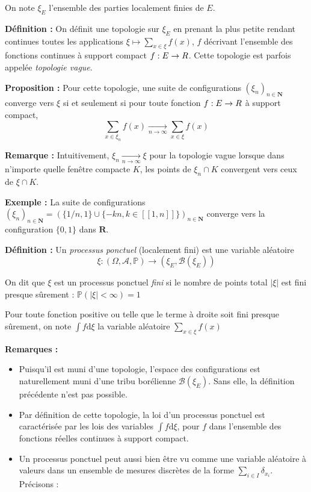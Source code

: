 \documentclass[12pt]{article}
\let\oldsum\sum
\renewcommand{\sum}{\oldsum\limits}
\begin{document}
On note $ \xi_E $ l'ensemble des parties localement finies de $E$. 

\textbf{Définition :} On définit une topologie sur $ \xi_E $ en prenant la plus petite rendant continues toutes les applications $ \xi \mapsto \sum_{x \in \xi} f(x) $, $f$ décrivant l'ensemble des fonctions continues à support compact $ f : E \to \mathbf \mathbf R $. Cette topologie est parfois appelée \textit{topologie vague}.

\textbf{Proposition :} Pour cette topologie, une suite de configurations $(\xi_n)_{n \in \mathbf N}$ converge vers $\xi$ si et seulement si pour toute fonction $f : E \to \mathbf \mathbf R $ à support compact, $$ \sum_{x \in \xi_n} f(x) \xrightarrow[n\to\infty]{} \sum_{x \in \xi} f(x) $$

\textbf{Remarque :} Intuitivement, $ \xi_n \xrightarrow[n\to\infty]{} \xi $ pour la topologie vague lorsque dans n'importe quelle \og fenêtre \fg \: compacte $K$, les points de $\xi_n \cap K$ convergent vers ceux de $\xi \cap K$.

\textbf{Exemple :} La suite de configurations $(\xi_n)_{n\in\mathbf N} = (\{1/n,1\} \cup \{-kn, k \in [\![1,n]\!]\})_{n\in\mathbf N}$ converge vers la configuration $\{0,1\}$ dans $\mathbf R$.

\textbf{Définition :} Un \textit{processus ponctuel} (localement fini) est une variable aléatoire $$ \xi : (\Omega, \mathcal A, \mathbb P) \to ( \xi_E, \mathcal B(\xi_E )) $$

On dit que $\xi$ est un processus ponctuel \textit{fini} si le nombre de points total $|\xi|$ est fini presque sûrement : $ \mathbb P( |\xi| < \infty) = 1$ 

Pour toute fonction positive ou telle que le terme à droite soit fini presque sûrement, on note $ \int f \mathrm d \xi $ la variable aléatoire $ \sum_{x \in \xi} f(x) $

\textbf{Remarques :} 

\begin{itemize} 
    
  \item Puisqu'il est muni d'une topologie, l'espace des configurations est naturellement muni d'une tribu borélienne $\mathcal B(\xi_E )$. Sans elle, la définition précédente n'est pas possible.

  \item Par définition de cette topologie, la loi d'un processus ponctuel est caractérisée par les lois des variables $ \int f \mathrm d \xi $, pour $f$ dans l'ensemble des fonctions réelles continues à support compact.

  \item Un processus ponctuel peut aussi bien être vu comme une variable aléatoire à valeurs dans un ensemble de mesures discrètes de la forme $ \displaystyle \sum_{i\in I} \delta_{x_i} $. Précisons :

\end{itemize}
\end{document}
